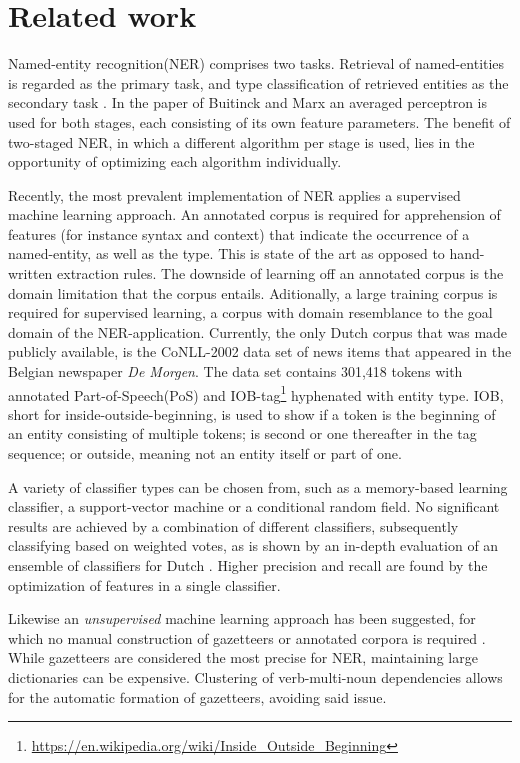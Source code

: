 \section{Related work} \label{sec:rel}
Named-entity recognition(NER) comprises two tasks. Retrieval of named-entities is regarded as the primary task, and type classification of retrieved entities as the secondary task \cite{buitinck2012two}. In the paper of Buitinck and Marx an averaged perceptron is used for both stages, each consisting of its own feature parameters. The benefit of two-staged NER, in which a different algorithm per stage is used, lies in the opportunity of optimizing each algorithm individually.  

Recently, the most prevalent implementation of NER applies a supervised machine learning approach. An annotated corpus is required for apprehension of features (for instance syntax and context) that indicate the occurrence of a named-entity, as well as the type. This is state of the art as opposed to hand-written extraction rules. The downside of learning off an annotated corpus is the domain limitation that the corpus entails. Aditionally, a large training corpus is required for supervised learning, a corpus with domain resemblance to the goal domain of the NER-application. Currently, the only Dutch corpus that was made publicly available, is the CoNLL-2002 data set of news items that appeared in the Belgian newspaper \textit{De Morgen}. The data set contains 301,418 tokens with annotated Part-of-Speech(PoS) and IOB-tag\footnote{\url{https://en.wikipedia.org/wiki/Inside_Outside_Beginning}} hyphenated with entity type. IOB, short for inside-outside-beginning, is used to show if a token is the beginning of an entity consisting of multiple tokens; is second or one thereafter in the tag sequence; or outside, meaning not an entity itself or part of one.

A variety of classifier types can be chosen from, such as a memory-based learning classifier, a support-vector machine or a conditional random field.
No significant results are achieved by a combination of different classifiers, subsequently classifying based on weighted votes, as is shown by an in-depth evaluation of an ensemble of classifiers for Dutch  \cite{desmet2014fine}. Higher precision and recall are found by the optimization of features in a single classifier.

Likewise an \textit{unsupervised} machine learning approach has been suggested, for which no manual construction of gazetteers or annotated corpora is required \cite{kazama2008inducing}. While gazetteers are considered the most precise for NER, maintaining large dictionaries can be expensive. Clustering of verb-multi-noun dependencies allows for the automatic formation of gazetteers, avoiding said issue.

